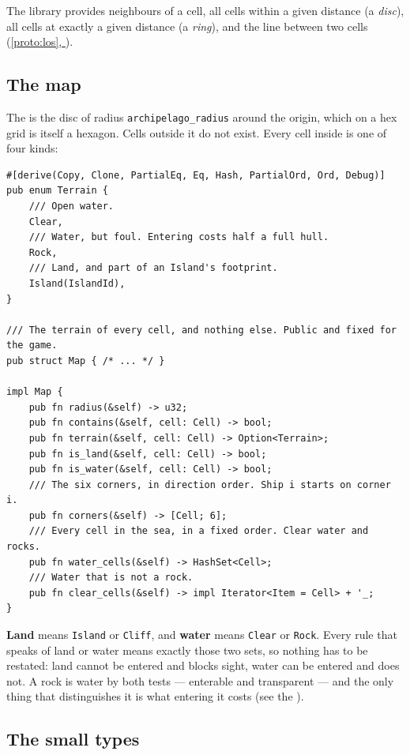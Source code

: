 \documentclass{article}
\newcommand{\fullref}[1]{\hyperref[#1]{\cref*{#1}, \nameref*{#1}}}
\begin{document}
The library provides neighbours of a cell, all cells within a given distance (a \emph{disc}), all
cells at exactly a given distance (a \emph{ring}), and the line between two cells
(\fullref{proto:los}).

\subsection{The map}
\label{proto:map}

The \archipelago{} is the disc of radius \texttt{archipelago\_radius} around the origin, which on
a hex grid is itself a hexagon. Cells outside it do not exist. Every cell inside is one of four
kinds:

\begin{lstlisting}
#[derive(Copy, Clone, PartialEq, Eq, Hash, PartialOrd, Ord, Debug)]
pub enum Terrain {
    /// Open water.
    Clear,
    /// Water, but foul. Entering costs half a full hull.
    Rock,
    /// Land, and part of an Island's footprint.
    Island(IslandId),
}

/// The terrain of every cell, and nothing else. Public and fixed for the game.
pub struct Map { /* ... */ }

impl Map {
    pub fn radius(&self) -> u32;
    pub fn contains(&self, cell: Cell) -> bool;
    pub fn terrain(&self, cell: Cell) -> Option<Terrain>;
    pub fn is_land(&self, cell: Cell) -> bool;
    pub fn is_water(&self, cell: Cell) -> bool;
    /// The six corners, in direction order. Ship i starts on corner i.
    pub fn corners(&self) -> [Cell; 6];
    /// Every cell in the sea, in a fixed order. Clear water and rocks.
    pub fn water_cells(&self) -> HashSet<Cell>;
    /// Water that is not a rock.
    pub fn clear_cells(&self) -> impl Iterator<Item = Cell> + '_;
}
\end{lstlisting}

\textbf{Land} means \texttt{Island} or \texttt{Cliff}, and \textbf{water} means \texttt{Clear} or
\texttt{Rock}. Every rule that speaks of land or water means exactly those two sets, so nothing
has to be restated: land cannot be entered and blocks sight, water can be entered and does not. A
rock is water by both tests --- enterable and transparent --- and the only thing that
distinguishes it is what entering it costs (see the \MD).

\subsection{The small types}
\label{proto:types}
\end{document}
